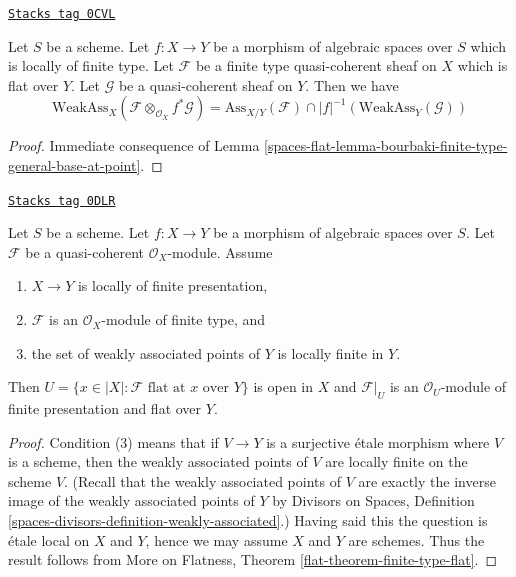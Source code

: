 \begin{lemma}
\label{spaces-flat-lemma-bourbaki-finite-type-general-base}
\href{https://stacks.math.columbia.edu/tag/0CVL}{\texttt{Stacks tag 0CVL}}

Let $S$ be a scheme. Let $f : X \to Y$ be a morphism of algebraic spaces
over $S$ which is locally of finite type.
Let $\mathcal{F}$ be a finite type quasi-coherent sheaf on $X$
which is flat over $Y$. Let $\mathcal{G}$ be a quasi-coherent sheaf on $Y$.
Then we have
$$
\text{WeakAss}_X(\mathcal{F} \otimes_{\mathcal{O}_X} f^*\mathcal{G}) =
\text{Ass}_{X/Y}(\mathcal{F}) \cap
|f|^{-1}(\text{WeakAss}_Y(\mathcal{G}))
$$
\end{lemma}

\begin{proof}
Immediate consequence of
Lemma \ref{spaces-flat-lemma-bourbaki-finite-type-general-base-at-point}.
\end{proof}

\begin{theorem}
\label{spaces-flat-theorem-finite-type-flat}
\href{https://stacks.math.columbia.edu/tag/0DLR}{\texttt{Stacks tag 0DLR}}

Let $S$ be a scheme.
Let $f : X \to Y$ be a morphism of algebraic spaces over $S$.
Let $\mathcal{F}$ be a quasi-coherent $\mathcal{O}_X$-module.
Assume
\begin{enumerate}
\item $X \to Y$ is locally of finite presentation,
\item $\mathcal{F}$ is an $\mathcal{O}_X$-module of finite type, and
\item the set of weakly associated points of $Y$ is locally finite in $Y$.
\end{enumerate}
Then $U = \{x \in |X| : \mathcal{F}\text{ flat at }x\text{ over }Y\}$
is open in $X$ and $\mathcal{F}|_U$ is an $\mathcal{O}_U$-module
of finite presentation and flat over $Y$.
\end{theorem}

\begin{proof}
Condition (3) means that if $V \to Y$ is a surjective \'etale morphism
where $V$ is a scheme, then the weakly associated points of $V$
are locally finite on the scheme $V$. (Recall that the weakly associated
points of $V$ are exactly the inverse image of the weakly associated
points of $Y$ by Divisors on Spaces, Definition
\ref{spaces-divisors-definition-weakly-associated}.)
Having said this the question
is \'etale local on $X$ and $Y$, hence we may assume $X$ and $Y$
are schemes. Thus the result follows from
More on Flatness, Theorem \ref{flat-theorem-finite-type-flat}.
\end{proof}

